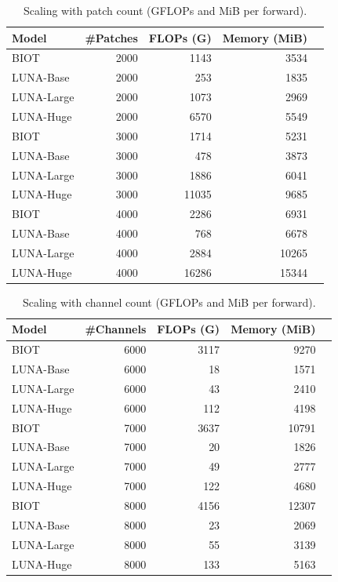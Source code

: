 \begin{table}[h]
\centering
\caption{Scaling with patch count (GFLOPs and MiB per forward).}
\label{tab:biot_patches}
\small
\begin{tabular}{lrrrr}
\toprule
Model & \#Patches & FLOPs (G) & Memory (MiB) \\
\midrule
BIOT & 2000 & 1143 & 3534 \\
LUNA-Base & 2000 & 253 & 1835 \\
LUNA-Large & 2000 & 1073 & 2969 \\
LUNA-Huge & 2000 & 6570 & 5549 \\
BIOT & 3000 & 1714 & 5231 \\
LUNA-Base & 3000 & 478 & 3873 \\
LUNA-Large & 3000 & 1886 & 6041 \\
LUNA-Huge & 3000 & 11035 & 9685 \\
BIOT & 4000 & 2286 & 6931 \\
LUNA-Base & 4000 & 768 & 6678 \\
LUNA-Large & 4000 & 2884 & 10265 \\
LUNA-Huge & 4000 & 16286 & 15344 \\
\bottomrule
\end{tabular}
\end{table}

\begin{table}[h]
\centering
\caption{Scaling with channel count (GFLOPs and MiB per forward).}
\label{tab:biot_channels}
\small
\begin{tabular}{lrrrr}
\toprule
Model & \#Channels & FLOPs (G) & Memory (MiB) \\
\midrule
BIOT & 6000 & 3117 & 9270 \\
LUNA-Base & 6000 & 18 & 1571 \\
LUNA-Large & 6000 & 43 & 2410 \\
LUNA-Huge & 6000 & 112 & 4198 \\
BIOT & 7000 & 3637 & 10791 \\
LUNA-Base & 7000 & 20 & 1826 \\
LUNA-Large & 7000 & 49 & 2777 \\
LUNA-Huge & 7000 & 122 & 4680 \\
BIOT & 8000 & 4156 & 12307 \\
LUNA-Base & 8000 & 23 & 2069 \\
LUNA-Large & 8000 & 55 & 3139 \\
LUNA-Huge & 8000 & 133 & 5163 \\
\bottomrule
\end{tabular}
\end{table}

